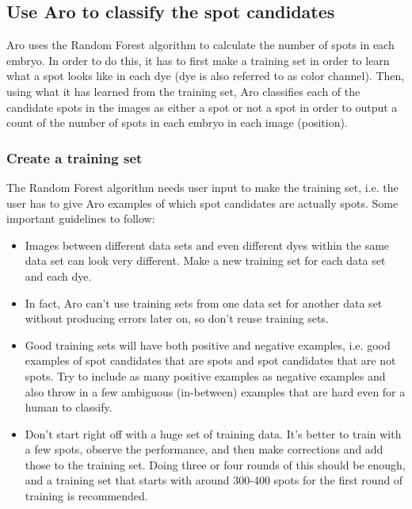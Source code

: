 \documentclass[titlepage,11pt]{article}
\begin{document}
\subsection{Use Aro to classify the spot candidates}\label{sec:classification}

Aro uses the Random Forest algorithm to calculate the number of spots in each embryo. In order to do this, it has to first make a training set in order to learn what a spot looks like in each dye (dye is also referred to as color channel). Then, using what it has learned from the training set, Aro classifies each of the candidate spots in the images as either a spot or not a spot in order to output a count of the number of spots in each embryo in each image (position).

\subsubsection{Create a training set}\label{sec:trainingsets}

The Random Forest algorithm needs user input to make the training set, i.e. the user has to give Aro examples of which spot candidates are actually spots. Some important guidelines to follow: 
\begin{itemize}
\item Images between different data sets and even different dyes within the same data set can look very different. Make a new training set for each data set and each dye.
\item In fact, Aro can't use training sets from one data set for another data set without producing errors later on, so don't reuse training sets.
\item Good training sets will have both positive and negative examples, i.e. good examples of spot candidates that are spots and spot candidates that are not spots. Try to include as many positive examples as negative examples and also throw in a few ambiguous (in-between) examples that are hard even for a human to classify.
\item Don't start right off with a huge set of training data. It's better to train with a few spots, observe the performance, and then make corrections and add those to the training set. Doing three or four rounds of this should be enough, and a training set that starts with around 300-400 spots for the first round of training is recommended.
\end{itemize}
\end{document}

